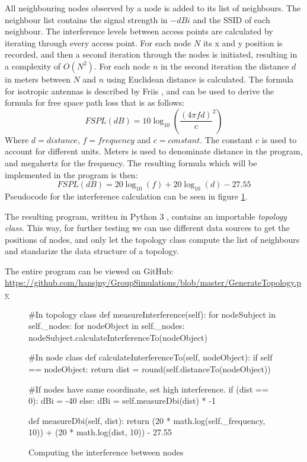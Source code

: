 	All neighbouring nodes observed by a node is added to its list of neighbours. The neighbour list contains the signal strength in $-dBi$ and the SSID of each neighbour.
	The interference levels between access points are calculated by iterating through every access point. For each node $N$ its x and y position is recorded,
	and then a second iteration through the nodes is initiated, resulting in a complexity of $O(N^2)$. For each node $n$ in the second iteration the distance $d$ in
	meters between $N$ and $n$ using Euclidean distance is calculated. The formula for isotropic antennas is described by Friis \cite{Friis46}, and can be used to
	derive the formula for free space path loss \cite{FSPL} that is as follows:
\[
	FSPL(dB) = 10\log_{10} \left( \frac{ (4 \pi f d)}{c} ^2 \right) 
\]	
	Where $d = distance$, $f = frequency$ and $c=constant$. The constant $c$ is used to account for different units. Meters is used to denominate distance in the program,
	and megahertz for the frequency. The resulting formula which will be implemented in the program is then: 
\[
	FSPL(dB) = 20\log_{10}\left( f \right)  + 20\log_{10} \left(d\right) - 27.55
\]	
	Pseudocode for the interference calculation can be seen in figure \ref{fig:dbiCreation}. 

	The resulting program, written in Python 3 \cite{Python3}, contains an importable \textit{topology class}. This way, for further testing we can use different data
	sources to get the positions of nodes, and only let the topology class compute the list of neighbours and standarize the data structure of a topology.

	The entire program can be viewed on GitHub: \newline
{\small \url{https://github.com/hansjny/GroupSimulations/blob/master/GenerateTopology.py}}

	

	\begin{figure}
		\begin{python}
#In topology class
def measureInterference(self):
 for nodeSubject in self._nodes:  
  for nodeObject in self._nodes:
    nodeSubject.calculateInterferenceTo(nodeObject) 

#In node class
def calculateInterferenceTo(self, nodeObject):
 if self == nodeObject:
  return
 dist = round(self.distanceTo(nodeObject))

#If  nodes have same coordinate, set high interference. 
 if (dist == 0):
  dBi = -40
 else:
  dBi  = self.measureDbi(dist) * -1

def measureDbi(self, dist):
 return (20 * math.log(self._frequency, 10)) + 
(20 * math.log(dist, 10)) - 27.55

\end{python}
\caption{Computing the interference between nodes}
\label{fig:dbiCreation}
\end{figure}

